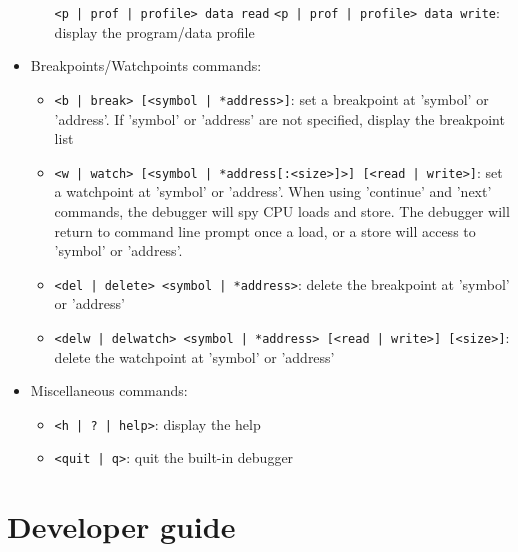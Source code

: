 \begin{itemize}
\begin{itemize}
	\texttt{<p | prof | profile> data read} \newline
	\texttt{<p | prof | profile> data write}: \newline
	display the program/data profile
	\end{itemize}
\item Breakpoints/Watchpoints commands:
	\begin{itemize}
	\item \texttt{<b | break> [<symbol | *address>]}: \newline
	set a breakpoint at 'symbol' or 'address'. If 'symbol' or 'address' are not specified, display the breakpoint list
	\item \texttt{<w | watch> [<symbol | *address[:<size>]>] [<read | write>]}: \newline
	set a watchpoint at 'symbol' or 'address'. When using 'continue' and 'next' commands, the debugger will spy CPU loads and store. The debugger will return to command line prompt once a load, or a store will access to 'symbol' or 'address'.
	\item \texttt{<del | delete> <symbol | *address>}: \newline
	delete the breakpoint at 'symbol' or 'address'
	\item \texttt{<delw | delwatch> <symbol | *address> [<read | write>] [<size>]}: \newline
	delete the watchpoint at 'symbol' or 'address'
	\end{itemize}
\item Miscellaneous commands:
	\begin{itemize}
	\item \texttt{<h | ? | help>}: \newline
	display the help
	\item \texttt{<quit | q>}: \newline
	quit the built-in debugger
	\end{itemize}
\end{itemize}

\newpage
\section{Developer guide}

